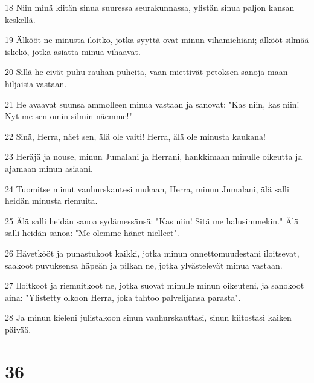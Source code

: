 \par 18 Niin minä kiitän sinua suuressa seurakunnassa, ylistän sinua paljon kansan keskellä.
\par 19 Älkööt ne minusta iloitko, jotka syyttä ovat minun vihamiehiäni; älkööt silmää iskekö, jotka asiatta minua vihaavat.
\par 20 Sillä he eivät puhu rauhan puheita, vaan miettivät petoksen sanoja maan hiljaisia vastaan.
\par 21 He avaavat suunsa ammolleen minua vastaan ja sanovat: "Kas niin, kas niin! Nyt me sen omin silmin näemme!"
\par 22 Sinä, Herra, näet sen, älä ole vaiti! Herra, älä ole minusta kaukana!
\par 23 Heräjä ja nouse, minun Jumalani ja Herrani, hankkimaan minulle oikeutta ja ajamaan minun asiaani.
\par 24 Tuomitse minut vanhurskautesi mukaan, Herra, minun Jumalani, älä salli heidän minusta riemuita.
\par 25 Älä salli heidän sanoa sydämessänsä: "Kas niin! Sitä me halusimmekin." Älä salli heidän sanoa: "Me olemme hänet nielleet".
\par 26 Hävetkööt ja punastukoot kaikki, jotka minun onnettomuudestani iloitsevat, saakoot puvuksensa häpeän ja pilkan ne, jotka ylvästelevät minua vastaan.
\par 27 Iloitkoot ja riemuitkoot ne, jotka suovat minulle minun oikeuteni, ja sanokoot aina: "Ylistetty olkoon Herra, joka tahtoo palvelijansa parasta".
\par 28 Ja minun kieleni julistakoon sinun vanhurskauttasi, sinun kiitostasi kaiken päivää.

\chapter{36}

